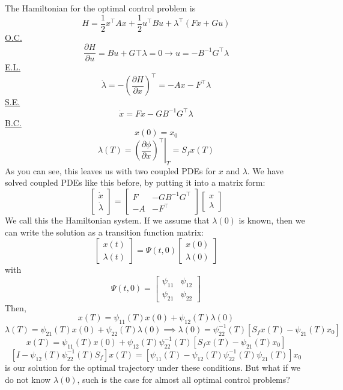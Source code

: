 \documentclass{article}
\begin{document}
\noindent
The Hamiltonian for the optimal control problem is
\[H = \frac{1}{2}x^\top Ax + \frac{1}{2}u^\top Bu + \lambda^\top(Fx+Gu)\]
\underline{O.C.}
\[\frac{\partial H}{\partial u} = Bu + G\top\lambda = 0 \rightarrow u = -B^{-1}G^\top\lambda\]
\underline{E.L.}
\[\dot{\lambda} = -\left(\frac{\partial H}{\partial x}\right)^\top = -Ax-F^\top\lambda\]
\underline{S.E.}
\[\dot{x} = Fx - GB^{-1}G^\top\lambda\]
\underline{B.C.}
\[x(0) = x_0\]
\[\lambda(T) = \left.\left(\frac{\partial\phi}{\partial x}\right)^\top\right|_{T} = S_f x(T)\]
As you can see, this leaves us with two coupled PDEs for $x$ and $\lambda$. We have solved coupled
PDEs like this before, by putting it into a matrix form:
\[\left[\begin{matrix}
    \dot{x} \\ \dot{\lambda}
\end{matrix}\right] = \left[\begin{matrix}
    F & -GB^{-1}G^\top \\
    -A & -F^\top
\end{matrix}\right]\left[\begin{matrix}
    x \\ \lambda
\end{matrix}\right]\]
We call this the Hamiltonian system. If we assume that $\lambda(0)$ is known, then
we can write the solution as a transition function matrix:
\[\left[\begin{matrix}
    x(t) \\ \lambda(t)
\end{matrix}\right] = \Psi(t, 0)\left[\begin{matrix}
    x(0) \\ \lambda(0)
\end{matrix}\right]\]
with
\[\Psi(t, 0) = \left[\begin{matrix}
    \psi_{11} & \psi_{12} \\
    \psi_{21} & \psi_{22}
\end{matrix}\right]\]
Then,
\[x(T) = \psi_{11}(T)x(0) + \psi_{12}(T)\lambda(0)\]
\[\lambda(T) = \psi_{21}(T)x(0) + \psi_{22}(T)\lambda(0) \implies
\lambda(0) = \psi_{22}^{-1}(T)\left[S_f x(T) - \psi_{21}(T)x_0\right]\]
\[x(T) = \psi_{11}(T)x(0) + \psi_{12}(T)\psi_{22}^{-1}(T)\left[S_f x(T) - \psi_{21}(T)x_0\right]\]
\[\left[I - \psi_{12}(T)\psi_{22}^{-1}(T)S_f\right]x(T) = \left[\psi_{11}(T)
- \psi_{12}(T)\psi_{22}^{-1}(T)\psi_{21}(T)\right]x_0\]
is our solution for the optimal trajectory under these conditions. But what if
we do not know $\lambda(0)$, such is the case for almost all optimal control problems?
\end{document}
